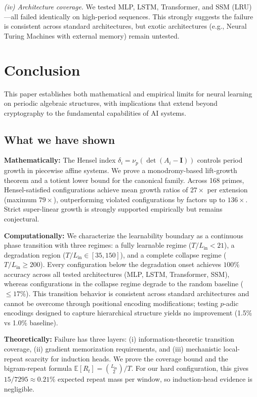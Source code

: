 \documentclass[11pt]{article}
\theoremstyle{plain}
\theoremstyle{definition}
\newcommand{\vp}{\nu_p}
\newcommand{\Id}{\mathbf{I}}
\begin{document}
\textit{(iv) Architecture coverage.} We tested MLP, LSTM, Transformer, and SSM (LRU)---all failed identically on high-period sequences. This strongly suggests the failure is consistent across standard architectures, but exotic architectures (e.g., Neural Turing Machines with external memory) remain untested.

\section{Conclusion}
\label{sec:conclusion}

This paper establishes both mathematical and empirical limits for neural learning on periodic algebraic structures, with implications that extend beyond cryptography to the fundamental capabilities of AI systems.

\subsection{What we have shown}

\textbf{Mathematically:} The Hensel index $\delta_i = \vp(\det(A_i - \Id))$ controls period growth in piecewise affine systems. We prove a monodromy-based lift-growth theorem and a totient lower bound for the canonical family. Across 168 primes, Hensel-satisfied configurations achieve mean growth ratios of $27\times$ per extension (maximum $79\times$), outperforming violated configurations by factors up to $136\times$. Strict super-linear growth is strongly supported empirically but remains conjectural.

\textbf{Computationally:} We characterize the learnability boundary as a continuous phase transition with three regimes: a fully learnable regime ($T/L_{\mathrm{in}} < 21$), a degradation region ($T/L_{\mathrm{in}} \in [35, 150]$), and a complete collapse regime ($T/L_{\mathrm{in}} \ge 200$). Every configuration below the degradation onset achieves $100\%$ accuracy across all tested architectures (MLP, LSTM, Transformer, SSM), whereas configurations in the collapse regime degrade to the random baseline ($\le 17\%$). This transition behavior is consistent across standard architectures and cannot be overcome through positional encoding modifications; testing $p$-adic encodings designed to capture hierarchical structure yields no improvement (1.5\% vs 1.0\% baseline).

\textbf{Theoretically:} Failure has three layers: (i) information-theoretic transition coverage, (ii) gradient memorization requirements, and (iii) mechanistic local-repeat scarcity for induction heads. We prove the coverage bound and the bigram-repeat formula $\mathbb{E}[R_t]=\binom{L_{\mathrm{in}}}{2}/T$. For our hard configuration, this gives $15/7295\approx 0.21\%$ expected repeat mass per window, so induction-head evidence is negligible.
\end{document}
